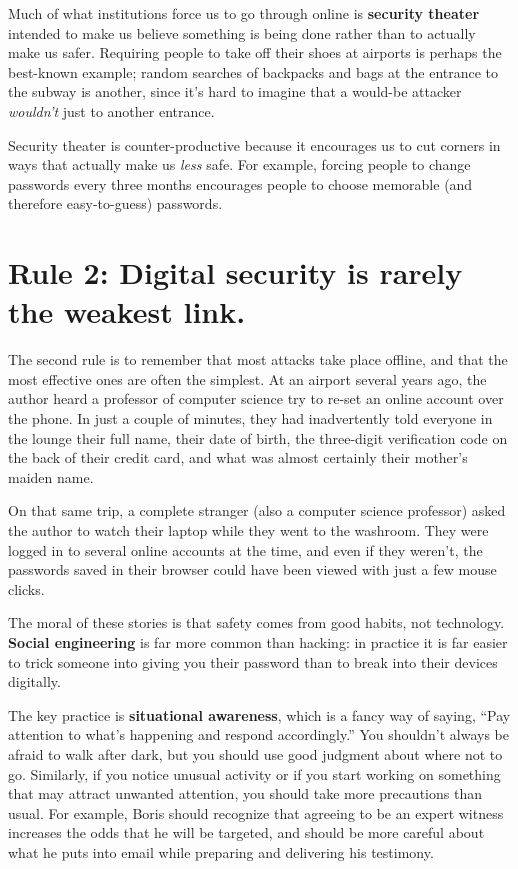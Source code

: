 \documentclass[10pt,letterpaper]{article}
\begin{document}
Much of what institutions force us to go through online is \textbf{security theater}
intended to make us believe something is being done
rather than to actually make us safer.
Requiring people to take off their shoes at airports is perhaps the best-known example;
random searches of backpacks and bags at the entrance to the subway is another,
since it's hard to imagine that a would-be attacker \emph{wouldn't} just to another entrance.

Security theater is counter-productive because it encourages us to cut corners
in ways that actually make us \emph{less} safe.
For example,
forcing people to change passwords every three months
encourages people to choose memorable (and therefore easy-to-guess) passwords.

\section*{Rule 2: Digital security is rarely the weakest link.}

The second rule is to remember that most attacks take place offline,
and that the most effective ones are often the simplest.
At an airport several years ago,
the author heard a professor of computer science try to re-set an online account over the phone.
In just a couple of minutes,
they had inadvertently told everyone in the lounge their full name,
their date of birth,
the three-digit verification code on the back of their credit card,
and what was almost certainly their mother's maiden name.

On that same trip,
a complete stranger (also a computer science professor)
asked the author to watch their laptop while they went to the washroom.
They were logged in to several online accounts at the time,
and even if they weren't,
the passwords saved in their browser could have been viewed with just a few mouse clicks.

The moral of these stories is that safety comes from good habits,
not technology.
\textbf{Social engineering} is far more common than hacking:
in practice it is far easier to trick someone into giving you their password
than to break into their devices digitally.

The key practice is \textbf{situational awareness},
which is a fancy way of saying,
``Pay attention to what's happening and respond accordingly.''
You shouldn't always be afraid to walk after dark,
but you should use good judgment about where not to go.
Similarly,
if you notice unusual activity or if you start working on something that may attract unwanted attention,
you should take more precautions than usual.
For example,
Boris should recognize that agreeing to be an expert witness
increases the odds that he will be targeted,
and should be more careful about what he puts into email while preparing and delivering his testimony.
\end{document}
